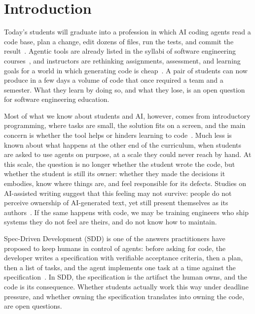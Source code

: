 \documentclass[conference]{IEEEtran}
\begin{document}
\section{Introduction}

Today's students will graduate into a profession in which AI coding agents read a code base, plan a change, edit dozens of files, run the tests, and commit the result~\cite{li2026aidev}. Agentic tools are already listed in the syllabi of software engineering courses~\cite{geng2026mapping}, and instructors are rethinking assignments, assessment, and learning goals for a world in which generating code is cheap~\cite{prather2023,denny2024,lau2023ban}. A pair of students can now produce in a few days a volume of code that once required a team and a semester. What they learn by doing so, and what they lose, is an open question for software engineering education.

Most of what we know about students and AI, however, comes from introductory programming, where tasks are small, the solution fits on a screen, and the main concern is whether the tool helps or hinders learning to code~\cite{kazemitabaar2023}. Much less is known about what happens at the other end of the curriculum, when students are asked to use agents on purpose, at a scale they could never reach by hand. At this scale, the question is no longer whether the student wrote the code, but whether the student is still its owner: whether they made the decisions it embodies, know where things are, and feel responsible for its defects. Studies on AI-assisted writing suggest that this feeling may not survive: people do not perceive ownership of AI-generated text, yet still present themselves as its authors~\cite{draxler2024}. If the same happens with code, we may be training engineers who ship systems they do not feel are theirs, and do not know how to maintain.

Spec-Driven Development (SDD) is one of the answers practitioners have proposed to keep humans in control of agents: before asking for code, the developer writes a specification with verifiable acceptance criteria, then a plan, then a list of tasks, and the agent implements one task at a time against the specification~\cite{delimarsky2025speckit,kiro2026specs,piskala2026sdd}. In SDD, the specification is the artifact the human owns, and the code is its consequence. Whether students actually work this way under deadline pressure, and whether owning the specification translates into owning the code, are open questions.
\end{document}
